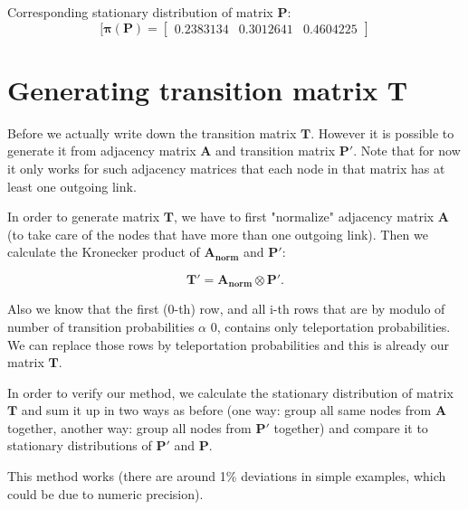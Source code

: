 \documentclass{article}
\begin{document}
Corresponding stationary distribution of matrix $\mathbf{P}$:
\begin{equation}
[\mathbf{\pi(P)} = 
\begin{bmatrix}
0.2383134 & 0.3012641 & 0.4604225
\end{bmatrix}
\label{eq:2_ex_v}
\end{equation}


\section{Generating transition matrix T}
Before we actually write down the transition matrix $\mathbf{T}$. However it is possible to generate it from adjacency matrix $\mathbf{A}$ and transition matrix $\mathbf{P'}$. Note that for now it only works for such adjacency matrices that each node in that matrix has at least one outgoing link. 

In order to generate matrix $\mathbf{T}$, we have to first "normalize" adjacency matrix $\mathbf{A}$ (to take care of the nodes that have more than one outgoing link). Then we calculate the Kronecker product of $\mathbf{A_{norm}}$ and $\mathbf{P'}$:

$$\mathbf{T'} = \mathbf{A_{norm}} \otimes \mathbf{P'}.$$

Also we know that the first (0-th) row, and all i-th rows that are by modulo of number of transition probabilities $\alpha$ 0, contains only teleportation probabilities. We can replace those rows by teleportation probabilities and this is already our matrix $\mathbf{T}$.  

In order to verify our method, we calculate the stationary distribution of matrix $\mathbf{T}$ and sum it up in two ways as before (one way: group all same nodes from $\mathbf{A}$ together, another way: group all nodes from $\mathbf{P'}$ together) and compare it to stationary distributions of $\mathbf{P'}$ and $\mathbf{P}$.

This method works (there are around 1\% deviations in simple examples, which could be due to numeric precision). 
\end{document}
